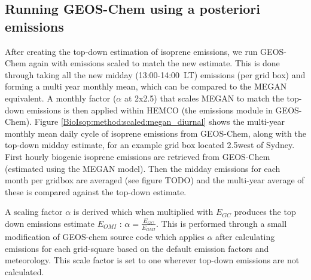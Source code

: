   \subsection{Running GEOS-Chem using a posteriori emissions}
  \label{BioIsop:method:scaled}
    
    After creating the top-down estimation of isoprene emissions, we run GEOS-Chem again with emissions scaled to match the new estimate. 
    This is done through taking all the new midday (13:00-14:00~LT) emissions (per grid box) and forming a multi year monthly mean, which can be compared to the MEGAN equivalent.
    A monthly factor ($\alpha$ at 2x2.5\degr) that scales MEGAN to match the top-down emissions is then applied within HEMCO (the emissions module in GEOS-Chem).
    Figure \ref{BioIsop:method:scaled:megan_diurnal} shows the multi-year monthly mean daily cycle of isoprene emissions from GEOS-Chem, along with the top-down midday estimate, for an example grid box located 2.5\degr west of Sydney.
    First hourly biogenic isoprene emissions are retrieved from GEOS-Chem (estimated using the MEGAN model).
    Then the midday emissions for each month per gridbox are averaged (see figure TODO) and the multi-year average of these is compared against the top-down estimate.
    
    
    A scaling factor $\alpha$ is derived which when multiplied with $E_{GC}$ produces the top down emissions estimate $E_{OMI}$ : $\alpha = \frac{E_{GC}}{E_{OMI}}$.
    This is performed through a small modification of GEOS-chem source code which applies $\alpha$ after calculating emissions for each grid-square based on the default emission factors and meteorology.
    This scale factor is set to one wherever top-down emissions are not calculated.

